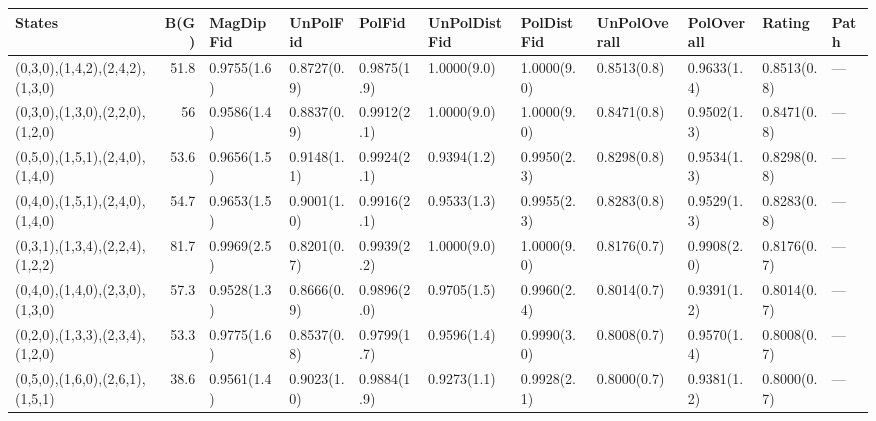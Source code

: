\begin{tabular}{lrlllllllll}
\hline
 States                          &   B(G) & MagDipFid   & UnPolFid    & PolFid      & UnPolDistFid   & PolDistFid   & UnPolOverall   & PolOverall   & Rating      & Path   \\
\hline
 (0,3,0),(1,4,2),(2,4,2),(1,3,0) &   51.8 & 0.9755(1.6) & 0.8727(0.9) & 0.9875(1.9) & 1.0000(9.0)    & 1.0000(9.0)  & 0.8513(0.8)    & 0.9633(1.4)  & 0.8513(0.8) & ---    \\
 (0,3,0),(1,3,0),(2,2,0),(1,2,0) &   56   & 0.9586(1.4) & 0.8837(0.9) & 0.9912(2.1) & 1.0000(9.0)    & 1.0000(9.0)  & 0.8471(0.8)    & 0.9502(1.3)  & 0.8471(0.8) & ---    \\
 (0,5,0),(1,5,1),(2,4,0),(1,4,0) &   53.6 & 0.9656(1.5) & 0.9148(1.1) & 0.9924(2.1) & 0.9394(1.2)    & 0.9950(2.3)  & 0.8298(0.8)    & 0.9534(1.3)  & 0.8298(0.8) & ---    \\
 (0,4,0),(1,5,1),(2,4,0),(1,4,0) &   54.7 & 0.9653(1.5) & 0.9001(1.0) & 0.9916(2.1) & 0.9533(1.3)    & 0.9955(2.3)  & 0.8283(0.8)    & 0.9529(1.3)  & 0.8283(0.8) & ---    \\
 (0,3,1),(1,3,4),(2,2,4),(1,2,2) &   81.7 & 0.9969(2.5) & 0.8201(0.7) & 0.9939(2.2) & 1.0000(9.0)    & 1.0000(9.0)  & 0.8176(0.7)    & 0.9908(2.0)  & 0.8176(0.7) & ---    \\
 (0,4,0),(1,4,0),(2,3,0),(1,3,0) &   57.3 & 0.9528(1.3) & 0.8666(0.9) & 0.9896(2.0) & 0.9705(1.5)    & 0.9960(2.4)  & 0.8014(0.7)    & 0.9391(1.2)  & 0.8014(0.7) & ---    \\
 (0,2,0),(1,3,3),(2,3,4),(1,2,0) &   53.3 & 0.9775(1.6) & 0.8537(0.8) & 0.9799(1.7) & 0.9596(1.4)    & 0.9990(3.0)  & 0.8008(0.7)    & 0.9570(1.4)  & 0.8008(0.7) & ---    \\
 (0,5,0),(1,6,0),(2,6,1),(1,5,1) &   38.6 & 0.9561(1.4) & 0.9023(1.0) & 0.9884(1.9) & 0.9273(1.1)    & 0.9928(2.1)  & 0.8000(0.7)    & 0.9381(1.2)  & 0.8000(0.7) & ---    \\
\hline
\end{tabular}